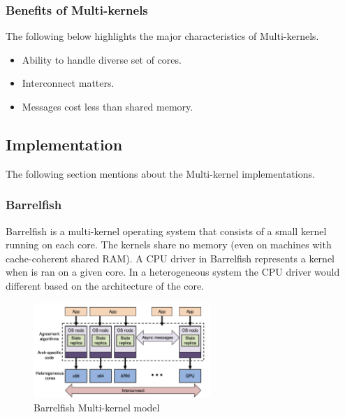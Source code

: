 \subsubsection{Benefits of Multi-kernels}
The following below highlights the major characteristics
of Multi-kernels. 

\begin{itemize}
  \item Ability to handle diverse set of cores.
  \item Interconnect matters. 
  \item Messages cost less than shared memory.
\end{itemize}

\subsection{Implementation}
The following section mentions about the Multi-kernel
implementations. 

\subsubsection{Barrelfish}
Barrelfish\cite{multi_kernel_first_paper} is a multi-kernel operating system that consists of a small kernel 
running on each core. The kernels share no memory (even on 
machines with cache-coherent shared RAM). A CPU 
driver in Barrelfish represents a kernel when is ran 
on a given core. In a heterogeneous system the CPU 
driver would different based on the architecture
of the core. 

\begin{figure}[htbp!] 
  \centering    
  \includegraphics[width=0.6\textwidth]{Multi-kernel}
  \caption[Multi-kernel]{Barrelfish Multi-kernel model \cite{multi_kernel_first_paper}}
  \label{fig:Barrelfish}
  \end{figure}


